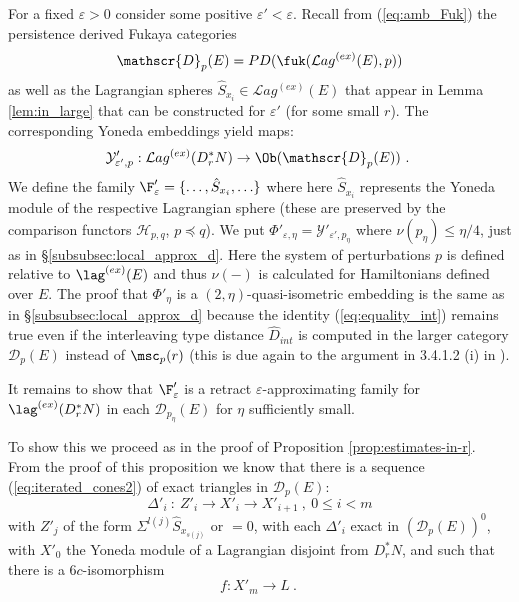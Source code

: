  For  a fixed  $\varepsilon >0$ consider some  positive $\varepsilon'<\varepsilon$.
 Recall from (\ref{eq:amb_Fuk}) the persistence derived Fukaya categories
 $$\mathscr{D}_{p}(E)=PD(\fuk(\mathcal{L}ag^{(ex)}(E), p))$$
 as well as the Lagrangian spheres $\hat{S}_{x_{i}}\in \mathcal{L}ag^{(ex)}(E)$ that appear
 in Lemma \ref{lem:in_large} that can be constructed for $\varepsilon' $ (for some small $r$). 
 The corresponding Yoneda embeddings yield maps:
 $$\mathcal{Y}'_{\varepsilon',p}:\mathcal{L}ag^{(ex)}(D^{\ast}_{r}N) \to \Ob(\mathscr{D}_{p}(E))~.~$$
 We define  the family $\F'_{\varepsilon}=\{\dots,\hat{S}_{x_{i}},\ldots\}$ where here $\hat{S}_{x_{i}}$ represents
 the Yoneda module of the respective Lagrangian sphere (these are preserved by the comparison 
 functors $\mathcal{H}_{p,q}$, $p\preceq q$). We put $\Phi'_{\varepsilon,\eta}=\mathcal{Y}'_{\varepsilon',p_{\eta}}$
 where $\nu(p_{\eta})\leq \eta/4$, just as in \S\ref{subsubsec:local_approx_d}. Here the system 
 of perturbations $p$ is defined relative to  $\lag^{(ex)}(E)$ and thus $\nu(-)$ is calculated for Hamiltonians
 defined over $E$. The proof that $\Phi'_{\eta}$ is a $(2,\eta)$-quasi-isometric  embedding is the same 
 as in \S\ref{subsubsec:local_approx_d} because the identity (\ref{eq:equality_int}) remains true even if the interleaving type
 distance $\hat{D}_{int}$ is computed in the larger category $\mathscr{D}_{p}(E)$ instead of $\msc_{p}(r)$ (this is due again
 to the argument in 3.4.1.2 (i) in \cite{BCZ:tpc}).
 
 It remains to show that $\F'_{\varepsilon}$ is a retract $\varepsilon$-approximating family for $\lag^{(ex)}(D^{\ast}_{r}N)$ in each 
 $\mathscr{D}_{p_{\eta}}(E)$ for $\eta$ sufficiently small.
 
 To show this we proceed as in the proof of Proposition \ref{prop:estimates-in-r}. From the proof of this proposition we 
 know that there is a sequence (\ref{eq:iterated_cones2}) of exact triangles in $\mathscr{D}_{p}(E)$:
 \begin{equation}\label{eq:iterated_cones3}
 \Delta'_{i} \ : \ Z'_{i}\longrightarrow X'_{i}\longrightarrow X'_{i+1} \ , \ 0\leq i < m
\end{equation}
with $Z'_{j}$ of the form $\Sigma^{l(j)}\hat{S}_{x_{s(j)}}$ or $=0$,
 with each $\Delta'_{i}$  exact in
 $(\mathscr{D}_{p}(E))^{0}$, with $X'_{0}$ the Yoneda module of a Lagrangian disjoint from $D^{\ast}_{r}N$, and 
 such that  there is a $6c$-isomorphism $$f: X'_{m}\to L~.~$$
 
